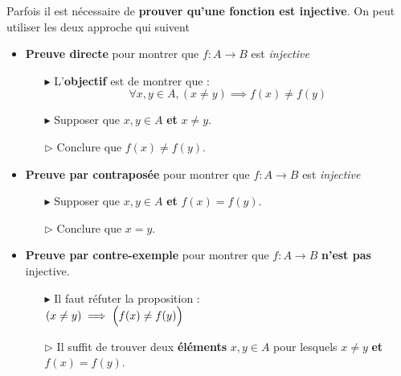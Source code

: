 \documentclass[16pt]{report}
\begin{document}
\begin{multicols*}{2}
        \begin{note}{}{}
            Parfois il est nécessaire de \textbf{prouver qu'une fonction est injective}. On peut utiliser 
            les deux approche qui suivent
        \end{note}
        

        
        \pagebreak
        \begin{itemize}
            \item \textbf{Preuve directe} pour montrer que $f : A \rightarrow  B$ est \textit{injective}    
                \begin{enumerate}
                    \item[$\blacktriangleright$] L'\textbf{objectif} est de montrer que : 
                        \[ \forall x, y \in A, (x \neq y) \implies f(x) \neq f(y) \]
                    \item[$\blacktriangleright$] Supposer que   $x, y \in A$ \textbf{et } $x \neq y$.   
                    \item[$\rhd$] Conclure que $f(x) \neq f(y)$.
                \end{enumerate} 
            \item \textbf{Preuve par contraposée} pour montrer que $f : A \rightarrow B$ est \textit{injective}  
                \begin{enumerate}
                    \item[$\blacktriangleright$] Supposer que $x, y \in A$ \textbf{et} $f(x) = f(y)$.  
                    \item[$\rhd$] Conclure que $x = y$.                    
                \end{enumerate}

            \item \textbf{Preuve par contre-exemple} pour montrer que $f : A \rightarrow B$ \textbf{n'est pas}
                injective.
                \begin{enumerate}
                    \item[$\blacktriangleright $]
                        Il faut réfuter la proposition : \\ $ (x \neq y) \implies \Bigl(f(x) \neq f(y) \Bigr) $
                    \item[$\rhd $] Il suffit de trouver deux \textbf{éléments} $x, y \in A$ pour 
                        lesquels $x \neq y$ \textbf{et} $f(x) = f(y)$.   
                \end{enumerate}


\end{itemize}
\end{multicols*}
\end{document}
